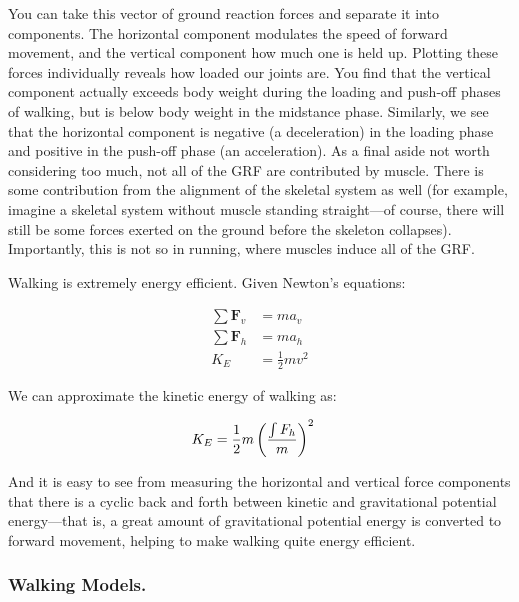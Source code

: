 You can take this vector of ground reaction forces and separate it into components. The horizontal component modulates the speed of forward movement, and the vertical component how much one is held up. Plotting these forces individually reveals how loaded our joints are. You find that the vertical component actually exceeds body weight during the loading and push-off phases of walking, but is below body weight in the midstance phase. Similarly, we see that the horizontal component is negative (a deceleration) in the loading phase and positive in the push-off phase (an acceleration). As a final aside not worth considering too much, not all of the GRF are contributed by muscle. There is some contribution from the alignment of the skeletal system as well (for example, imagine a skeletal system without muscle standing straight---of course, there will still be some forces exerted on the ground before the skeleton collapses). Importantly, this is not so in running, where muscles induce all of the GRF.\newline

Walking is extremely energy efficient. Given Newton's equations:

\begin{equation}
\begin{split}
    \sum \mathbf{F}_v &= ma_v \\
    \sum \mathbf{F}_h &= ma_h \\
    K_E &= \frac{1}{2}mv^2
\end{split}
\end{equation}

We can approximate the kinetic energy of walking as: 

\begin{equation}
\begin{split}
    K_E &= \frac{1}{2}m\left(\frac{\int {F}_h}{m}\right)^2
\end{split}
\end{equation}

And it is easy to see from measuring the horizontal and vertical force components that there is a cyclic back and forth between kinetic and gravitational potential energy---that is, a great amount of gravitational potential energy is converted to forward movement, helping to make walking quite energy efficient.

\subsubsection{Walking Models.}


